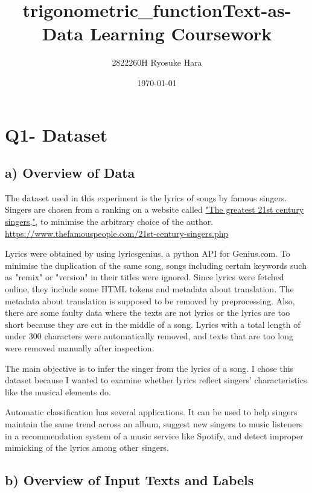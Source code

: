 \documentclass[a4paper,11pt]{article}
\title{\vspace{-10cm}trigonometric_function}
\begin{document}
\title{Text-as-Data Learning Coursework}
\author{2822260H Ryosuke Hara}
\date{\today}
\maketitle

\section{Q1- Dataset}
\subsection{a) Overview of Data}%
The dataset used in this experiment is the lyrics of songs by famous singers. 
Singers are chosen from a ranking on a website called \href{https://www.thefamouspeople.com/21st-century-singers.php}{"The greatest 21st century singers,"}, to minimise the arbitrary choice of the author.
\small{\url{https://www.thefamouspeople.com/21st-century-singers.php}}

Lyrics were obtained by using lyricsgenius, a python API for Genius.com.
To minimise the duplication of the same song, songs including certain keywords such as "remix" or "version" in their titles were ignored.
Since lyrics were fetched online, they include some HTML tokens and metadata about translation.
The metadata about translation is supposed to be removed by preprocessing.
Also, there are some faulty data where the texts are not lyrics or the lyrics are too short because they are cut in the middle of a song.
Lyrics with a total length of under 300 characters were automatically removed, and texts that are too long were removed manually after inspection.


The main objective is to infer the singer from the lyrics of a song.
I chose this dataset because I wanted to examine whether lyrics reflect singers' characteristics like the musical elements do.

Automatic classification has several applications.
It can be used to help singers maintain the same trend across an album,
suggest new singers to music listeners in a recommendation system of a music service like Spotify, and
detect improper mimicking of the lyrics among other singers. 

\subsection{b) Overview of Input Texts and Labels}
\end{document}
